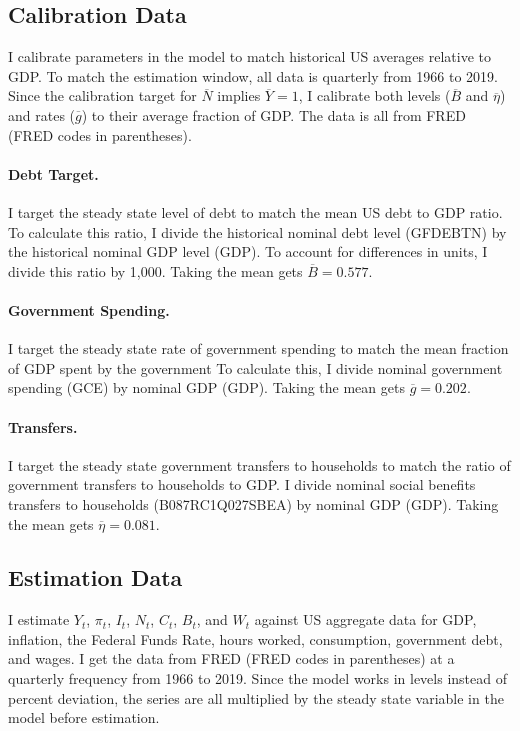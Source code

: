 \subsection{Calibration Data} \label{subapp:cal-data}
I calibrate parameters in the model to match historical US averages relative to GDP. To match the estimation window, all data is quarterly from 1966 to 2019. Since the calibration target for $\overline{N}$ implies $\overline{Y} = 1$, I calibrate both levels ($\overline{B}$ and $\overline{\eta}$) and rates ($\overline{g}$) to their average fraction of GDP. The data is all from FRED (FRED codes in parentheses).

\paragraph{Debt Target.}
I target the steady state level of debt to match the mean US debt to GDP ratio. To calculate this ratio, I divide the historical nominal debt level (GFDEBTN) by the historical nominal GDP level (GDP). To account for differences in units, I divide this ratio by 1,000. Taking the mean gets $\overline{B} = 0.577$.

\paragraph{Government Spending.}
I target the steady state rate of government spending to match the mean fraction of GDP spent by the government To calculate this, I divide nominal government spending (GCE) by nominal GDP (GDP). Taking the mean gets $\overline{g} = 0.202$.

\paragraph{Transfers.} 
I target the steady state government transfers to households to match the ratio of government transfers to households to GDP. I divide nominal social benefits transfers to households (B087RC1Q027SBEA) by nominal GDP (GDP). Taking the mean gets $\overline{\eta} = 0.081$.


\subsection{Estimation Data} \label{subapp:esti-data}
I estimate $Y_t$, $\pi_t$, $I_t$, $N_t$, $C_t$, $B_t$, and $W_t$ against US aggregate data for GDP, inflation, the Federal Funds Rate, hours worked, consumption, government debt, and wages. I get the data from FRED (FRED codes in parentheses) at a quarterly frequency from 1966 to 2019. Since the model works in levels instead of percent deviation, the series are all multiplied by the steady state variable in the model before estimation.

